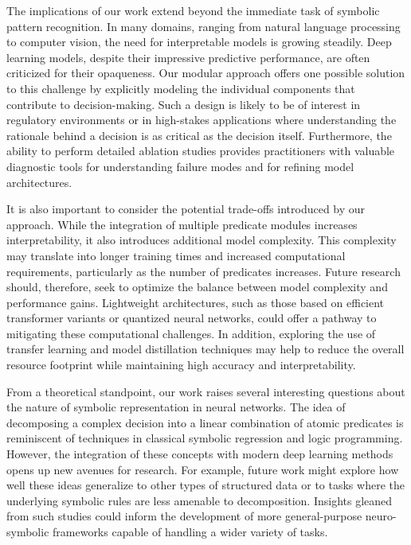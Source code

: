 \documentclass{article}
\begin{document}
The implications of our work extend beyond the immediate task of symbolic pattern recognition. In many domains, ranging from natural language processing to computer vision, the need for interpretable models is growing steadily. Deep learning models, despite their impressive predictive performance, are often criticized for their opaqueness. Our modular approach offers one possible solution to this challenge by explicitly modeling the individual components that contribute to decision-making. Such a design is likely to be of interest in regulatory environments or in high-stakes applications where understanding the rationale behind a decision is as critical as the decision itself. Furthermore, the ability to perform detailed ablation studies provides practitioners with valuable diagnostic tools for understanding failure modes and for refining model architectures.

It is also important to consider the potential trade-offs introduced by our approach. While the integration of multiple predicate modules increases interpretability, it also introduces additional model complexity. This complexity may translate into longer training times and increased computational requirements, particularly as the number of predicates increases. Future research should, therefore, seek to optimize the balance between model complexity and performance gains. Lightweight architectures, such as those based on efficient transformer variants or quantized neural networks, could offer a pathway to mitigating these computational challenges. In addition, exploring the use of transfer learning and model distillation techniques may help to reduce the overall resource footprint while maintaining high accuracy and interpretability.

From a theoretical standpoint, our work raises several interesting questions about the nature of symbolic representation in neural networks. The idea of decomposing a complex decision into a linear combination of atomic predicates is reminiscent of techniques in classical symbolic regression and logic programming. However, the integration of these concepts with modern deep learning methods opens up new avenues for research. For example, future work might explore how well these ideas generalize to other types of structured data or to tasks where the underlying symbolic rules are less amenable to decomposition. Insights gleaned from such studies could inform the development of more general-purpose neuro-symbolic frameworks capable of handling a wider variety of tasks.
\end{document}
